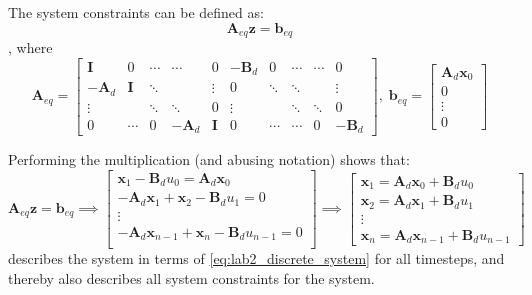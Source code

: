 \documentclass[../main.tex]{subfiles}
\begin{document}
The system constraints can be defined as: 
\begin{equation}\label{eq:lab2_physical_constraints}
	\bm A_{eq} \bm z = \bm b_{eq}
\end{equation}
, where
\begin{equation} \label{eq:lab2_Aeq_beq}
	\bm A_{eq} = 
	\begin{bmatrix}
		\bm I & 0 & \cdots & \cdots & 0 & -\bm B_d & 0 & \cdots & \cdots & 0 \\
		-\bm A_d & \bm I & \ddots & & \vdots & 0 & \ddots & \ddots & & \vdots \\
		\vdots && \ddots & \ddots & 0 & \vdots & & \ddots & \ddots & 0 \\
		0 & \cdots & 0 & -\bm A_d & \bm I & 0 & \cdots & \cdots & 0 & -\bm B_d
	\end{bmatrix}, \; 
	\bm b_{eq} =
	\begin{bmatrix}
		\bm A_d \bm x_0 \\ 0 \\ \vdots \\ 0
	\end{bmatrix}
\end{equation}

Performing the multiplication (and abusing notation) shows that:
\begin{equation} \label{eq:lab2_system_constraints}
	\bm A_{eq} \bm z = \bm b_{eq} \implies
	\begin{bmatrix}
		\bm x_1-\bm B_d u_0 = \bm A_d \bm x_0 \\
		-\bm A_d \bm x_1 + \bm x_2 - \bm B_d u_1 = 0 \\
		\vdots \\
		-\bm A_d \bm x_{n-1} + \bm x_n - \bm B_d u_{n-1} = 0 \\
	\end{bmatrix} \implies
	\begin{bmatrix}
		\bm x_1 = \bm A_d \bm x_0 + \bm B_d u_0 \\
		\bm x_2 = \bm A_d \bm x_1 + \bm B_d u_1 \\
	 	\vdots \\
		\bm x_n = \bm A_d \bm x_{n-1} + \bm B_d u_{n-1}
	\end{bmatrix}
\end{equation}
 describes the system in terms of \cref{eq:lab2_discrete_system} for all timesteps, and thereby also describes all system constraints for the system.
\end{document}
